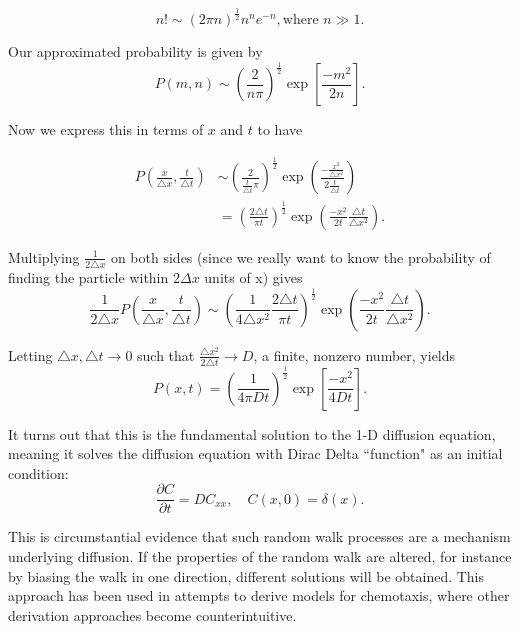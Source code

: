 \documentclass[]{article}
\numberwithin{equation}{section}		%
\newcommand{\delx}{\triangle{}x}
\newcommand{\delt}{\triangle{}t}
\begin{document}
\begin{equation}
    n!\sim(2\pi{}n)^{\frac{1}{2}}n^ne^{-n}, \text{where } n\gg 1.
\end{equation}

\noindent Our approximated probability is given by
\begin{equation}
    P(m,n)\sim \left(\frac{2}{n\pi}\right)^{\frac{1}{2}}\exp\left[\frac{-m^2}{2n}\right].
\end{equation}

\noindent Now we express this in terms of $x$ and $t$ to have

\begin{align}
P\left(\frac{x}{\triangle x},\frac{t}{\triangle t}\right) & \sim\left(\frac{2}{\frac{t}{\triangle t}\pi}\right)^{\frac{1}{2}}\exp\left(\frac{-\frac{x^{2}}{\triangle x^{2}}}{2\frac{t}{\triangle t}}\right)\\
 & =\left(\frac{2\triangle t}{\pi t}\right)^{\frac{1}{2}}\exp\left(\frac{-x^{2}}{2t}\frac{\triangle t}{\triangle x^{2}}\right).
\end{align}

\noindent Multiplying $\frac{1}{2\triangle x}$ on both sides (since we really want to know the probability of finding the particle within $2\Delta x$ units of x) gives
\begin{equation}
\frac{1}{2\triangle x}P\left(\frac{x}{\triangle x},\frac{t}{\triangle t}\right)\sim\left(\frac{1}{4\triangle x^{2}}\frac{2\triangle t}{\pi t}\right)^{\frac{1}{2}}\exp\left(\frac{-x^{2}}{2t}\frac{\triangle t}{\triangle x^{2}}\right).
\end{equation}

\noindent Letting $\delx, \delt \rightarrow 0$ such that
$\frac{\delx^2}{2\delt}\rightarrow D$, a finite, nonzero number, yields
\begin{equation}\label{fundamental soln}
    P(x,t)= \left(\frac{1}{4\pi{}Dt}\right)^{\frac{1}{2}}\exp\left[\frac{-x^2}{4Dt}\right].
\end{equation}

\noindent
It turns out that this is the fundamental solution to the 1-D diffusion
equation, meaning it solves the diffusion equation with Dirac Delta ``function" as an initial condition:
\begin{equation}
    \frac{\partial{}C}{\partial{}t}=DC_{xx}, \quad C(x,0)=\delta(x).
\end{equation}

This is circumstantial evidence that such random walk processes are
a mechanism underlying diffusion. If the properties of the random
walk are altered, for instance by biasing the walk in one direction,
different solutions will be obtained. This approach has been used in
attempts to derive models for chemotaxis, where other derivation
approaches become counterintuitive.
\end{document}
